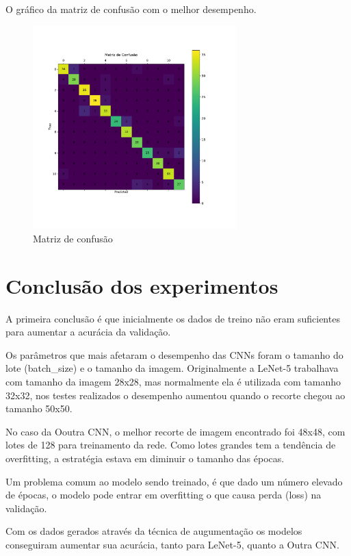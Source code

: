 \documentclass[12pt,
	english,			%
	french,				%
	spanish,			%
	brazil,				%
	]{article}
\begin{document}
O gráfico da matriz de confusão com o melhor desempenho.

\begin{figure}[!htb]
\centering
\includegraphics[width=0.7\textwidth]{images/cm_simple_cnn_augmented.pdf}
\caption{\label{fig:grafico01}Matriz de confusão}
\end{figure}

\clearpage

\section{Conclusão dos experimentos}

A primeira conclusão é que inicialmente os dados de treino não eram suficientes para aumentar a acurácia da validação.

Os parâmetros que mais afetaram o desempenho das CNNs foram o tamanho do lote (batch\_size) e o tamanho da imagem. Originalmente a LeNet-5 trabalhava com tamanho da imagem 28x28, mas normalmente ela é utilizada com tamanho 32x32, nos testes realizados o desempenho aumentou quando o recorte chegou ao tamanho 50x50.

No caso da Ooutra CNN, o melhor recorte de imagem encontrado foi 48x48, com lotes de 128 para treinamento da rede. Como lotes grandes tem a tendência de overfitting, a estratégia estava em diminuir o tamanho das épocas.

Um problema comum ao modelo sendo treinado, é que dado um número elevado de épocas, o modelo pode entrar em overfitting o que causa perda (loss) na validação.

Com os dados gerados através da técnica de augumentação os modelos conseguiram aumentar sua acurácia, tanto para LeNet-5, quanto a Outra CNN.
\end{document}
